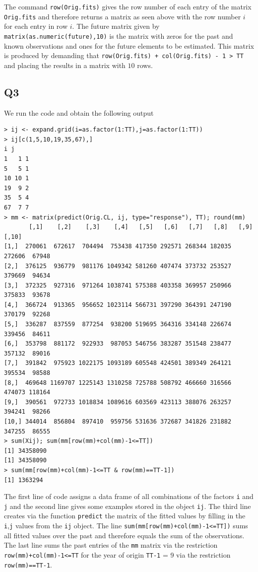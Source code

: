 \documentclass[11pt]{article}
\begin{document}
The command \verb|row(Orig.fits)| gives the row number of each entry of the matrix \verb|Orig.fits| and therefore returns a matrix as seen above with the row number $i$ for each entry in row $i$. The future matrix given by \verb|matrix(as.numeric(future),10)| is the matrix with zeros for the past and known observations and ones for the future elements to be estimated. This matrix is produced by demanding that \verb|row(Orig.fits) + col(Orig.fits) - 1 > TT| and placing the results in a matrix with $10$ rows.


\subsection*{Q3}
We run the code and obtain the following output

\begin{verbatim}
> ij <- expand.grid(i=as.factor(1:TT),j=as.factor(1:TT))
> ij[c(1,5,10,19,35,67),]
i j
1   1 1
5   5 1
10 10 1
19  9 2
35  5 4
67  7 7
> mm <- matrix(predict(Orig.CL, ij, type="response"), TT); round(mm)
       [,1]    [,2]    [,3]    [,4]   [,5]   [,6]   [,7]   [,8]   [,9]  [,10]
[1,]  270061  672617  704494  753438 417350 292571 268344 182035 272606  67948
[2,]  376125  936779  981176 1049342 581260 407474 373732 253527 379669  94634
[3,]  372325  927316  971264 1038741 575388 403358 369957 250966 375833  93678
[4,]  366724  913365  956652 1023114 566731 397290 364391 247190 370179  92268
[5,]  336287  837559  877254  938200 519695 364316 334148 226674 339456  84611
[6,]  353798  881172  922933  987053 546756 383287 351548 238477 357132  89016
[7,]  391842  975923 1022175 1093189 605548 424501 389349 264121 395534  98588
[8,]  469648 1169707 1225143 1310258 725788 508792 466660 316566 474073 118164
[9,]  390561  972733 1018834 1089616 603569 423113 388076 263257 394241  98266
[10,] 344014  856804  897410  959756 531636 372687 341826 231882 347255  86555
> sum(Xij); sum(mm[row(mm)+col(mm)-1<=TT])
[1] 34358090
[1] 34358090
> sum(mm[row(mm)+col(mm)-1<=TT & row(mm)==TT-1])
[1] 1363294
\end{verbatim}

The first line of code assigns a data frame of all combinations of the factors \verb|i| and \verb|j| and the second line gives some examples stored in the object \verb|ij|. The third line creates via the function \verb|predict| the matrix of the fitted values by filling in the \verb|i|,\verb|j| values from the \verb|ij| object. The line \verb|sum(mm[row(mm)+col(mm)-1<=TT])| sums all fitted values over the past and therefore equals the sum of the observations. The last line sums the past entries of the \verb|mm| matrix via the restriction \verb|row(mm)+col(mm)-1<=TT| for the year of origin \verb|TT-1| = 9 via the restriction \verb|row(mm)==TT-1|.
\end{document}
